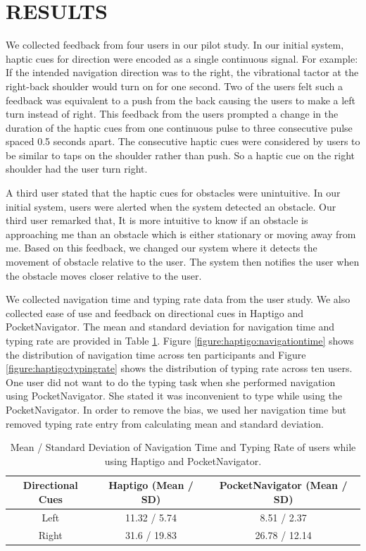 \documentclass{sigchi}
\newcommand\tabhead[1]{\small\textbf{#1}}
\begin{document}

\section{RESULTS}
We collected feedback from four users in our pilot study. In our initial system, haptic cues for direction were encoded as a single continuous signal. For example: If the intended navigation direction was to the right, the vibrational tactor at the right-back shoulder would turn on for one second. Two of the users felt such a feedback was equivalent to a push from the back causing the users to make a left turn instead of right. This feedback from the users prompted a change in the duration of the haptic cues from one continuous pulse to three consecutive pulse spaced 0.5 seconds apart. The consecutive haptic cues were considered by users to be similar to taps on the shoulder rather than push. So a haptic cue on the right shoulder had the user turn right.

A third user stated that the haptic cues for obstacles were unintuitive. In our initial system, users were alerted when the system detected an obstacle. Our third user remarked that, It is more intuitive to know if an obstacle is approaching me than an obstacle which is either stationary or moving away from me. Based on this feedback, we changed our system where it detects the movement of obstacle relative to the user. The system then notifies the user when the obstacle moves closer relative to the user.

We collected navigation time and typing rate data from the user study. We also collected ease of use and feedback on directional cues in Haptigo and PocketNavigator\cite{2010_Pielot_MobileHCI}. The mean and standard deviation for navigation time and typing rate are provided in Table \ref{table:navigationtime:typingrate}. Figure \ref{figure:haptigo:navigationtime} shows the distribution of navigation time across ten participants and Figure \ref{figure:haptigo:typingrate} shows the distribution of typing rate across ten users. One user did not want to do the typing task when she performed navigation using PocketNavigator\cite{2010_Pielot_MobileHCI}. She stated it was inconvenient to type while using the PocketNavigator\cite{2010_Pielot_MobileHCI}. In order to remove the bias, we used her navigation time but removed typing rate entry from calculating mean and standard deviation. 

\begin{table}[ht]
  \small
  \centering
  \begin{tabular}{|c|c|c|}
    \hline
    \tabhead{Directional Cues} & Haptigo (Mean / SD) & PocketNavigator (Mean / SD) \\
    \hline
    Left & 11.32 / 5.74 & 8.51 / 2.37\\
    \hline
    Right & 31.6 / 19.83 & 26.78 / 12.14\\
    \hline
  \end{tabular}
  \caption{Mean / Standard Deviation of Navigation Time and Typing Rate of users while using Haptigo and PocketNavigator.}
  \label{table:navigationtime:typingrate}
\end{table}
\end{document}
